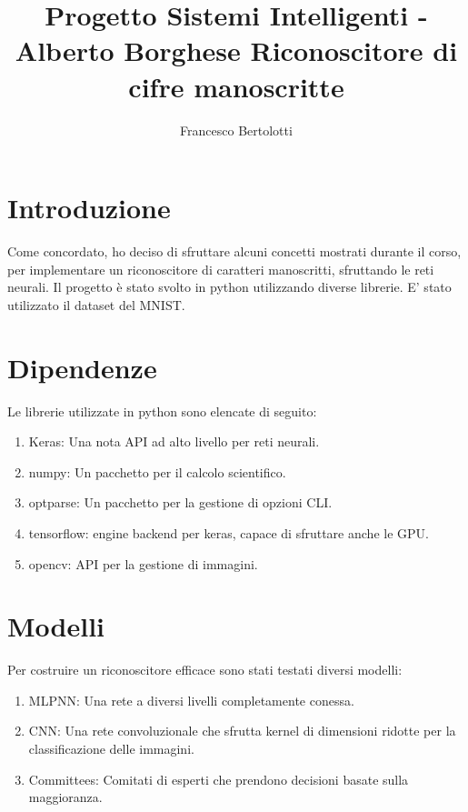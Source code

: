 \documentclass[12pt]{article}
\begin{document}
 
\title{Progetto Sistemi Intelligenti - Alberto Borghese
Riconoscitore di cifre manoscritte}%
\author{Francesco Bertolotti} %
 
\maketitle
 
\section{Introduzione}
Come concordato, ho deciso di sfruttare alcuni concetti mostrati
durante il corso, per implementare un riconoscitore di caratteri manoscritti, 
sfruttando le reti neurali. Il progetto è stato svolto in python utilizzando diverse librerie.
E' stato utilizzato il dataset del MNIST.


\section{Dipendenze}
Le librerie utilizzate in python sono elencate di seguito:
\begin{enumerate}
    \item Keras\cite{keras}: Una nota API ad alto livello per reti neurali.
    \item numpy: Un pacchetto per il calcolo scientifico.
    \item optparse: Un pacchetto per la gestione di opzioni CLI.
    \item tensorflow\cite{tensorflow}: engine backend per keras, capace di sfruttare anche le GPU.
    \item opencv\cite{opencv}: API per la gestione di immagini.
\end{enumerate}

\section{Modelli}
Per costruire un riconoscitore efficace sono stati testati diversi modelli:
\begin{enumerate}
    \item MLPNN: Una rete a diversi livelli completamente conessa.
    \item CNN\cite{cnn}: Una rete convoluzionale che sfrutta kernel di dimensioni ridotte
               per la classificazione delle immagini.
    \item Committees: Comitati di esperti che prendono decisioni basate sulla maggioranza.
\end{enumerate}
\end{document}

